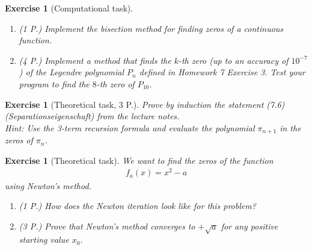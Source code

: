 \documentclass[11pt,a4paper,german]{scrartcl}
\newcounter{aufgnr}
\theoremstyle{break}   %
\newtheorem{aufg}[aufgnr]{Exercise}
\begin{document}
\begin{aufg}[Computational task]
\begin{enumerate}
\item (1 P.) Implement the bisection method for finding zeros of a continuous function. 
\item (4 P.) Implement a method that finds the \(k\)-th zero (up to an accuracy of \(10^{-7}\)) of the Legendre polynomial \(P_n\) defined in Homework 7 Exercise 3. Test your program to find the \(8\)-th zero of \(P_{10}\).
\end{enumerate}
\end{aufg}

\begin{aufg}[Theoretical task, 3 P.]
Prove by induction the statement (7.6) (Separationseigenschaft) from the lecture notes.\\
Hint: Use the 3-term recursion formula and evaluate the polynomial \(\pi_{n+1}\) in the zeros of \(\pi_n\).
\end{aufg}

\begin{aufg}[Theoretical task]
We want to find the zeros of the function
\begin{align*}
f_a(x) = x^2-a
\end{align*}
using Newton's method.
\begin{enumerate}
\item (1 P.) How does the Newton iteration look like for this problem?
\item (3 P.) Prove that Newton's method converges to \(+\sqrt{a}\) for any positive starting value \(x_0\).
\end{enumerate}
\end{aufg}
\end{document}
